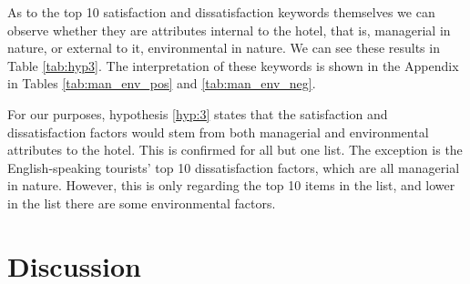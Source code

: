 As to the top 10 satisfaction and dissatisfaction keywords themselves we can observe whether they are attributes internal to the hotel, that is, managerial in nature, or external to it, environmental in nature. We can see these results in Table \ref{tab:hyp3}. The interpretation of these keywords is shown in the Appendix in Tables \ref{tab:man_env_pos} and \ref{tab:man_env_neg}.

\begin{table}[]
\caption{Managerial and Environmental nature of the most frequently used keywords}
\label{tab:hyp3}
\end{table}

For our purposes, hypothesis \ref{hyp:3} states that the satisfaction and dissatisfaction factors would stem from both managerial and environmental attributes to the hotel. This is confirmed for all but one list. The exception is the English-speaking tourists' top 10 dissatisfaction factors, which are all managerial in nature. However, this is only regarding the top 10 items in the list, and lower in the list there are some environmental factors.

\section{Discussion}\label{discussion}

